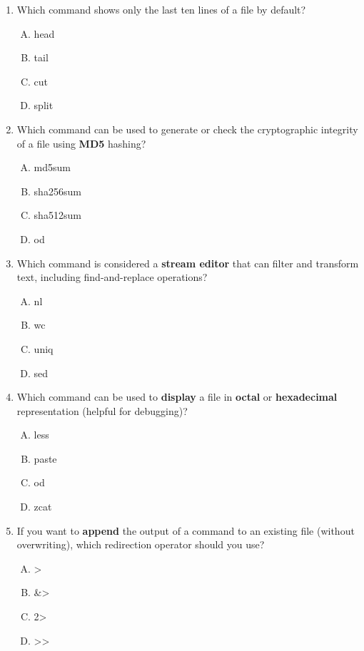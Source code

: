 \documentclass[a4paper]{report}
\begin{document}
\begin{enumerate}[1.]
    \item Which command shows only the last ten lines of a file by default?  
    \begin{enumerate}[A)]
        \item head  
        \item tail  
        \item cut  
        \item split  
    \end{enumerate}

    \item Which command can be used to generate or check the cryptographic integrity of a file using \textbf{MD5} hashing?  
    \begin{enumerate}[A)]
        \item md5sum  
        \item sha256sum  
        \item sha512sum  
        \item od  
    \end{enumerate}

    \item Which command is considered a \textbf{stream editor} that can filter and transform text, including find-and-replace operations?  
    \begin{enumerate}[A)]
        \item nl  
        \item wc  
        \item uniq  
        \item sed  
    \end{enumerate}

    \item Which command can be used to \textbf{display} a file in \textbf{octal} or \textbf{hexadecimal} representation (helpful for debugging)?  
    \begin{enumerate}[A)]
        \item less  
        \item paste  
        \item od  
        \item zcat  
    \end{enumerate}

    \item If you want to \textbf{append} the output of a command to an existing file (without overwriting), which redirection operator should you use?  
    \begin{enumerate}[A)]
        \item >  
        \item \&>  
        \item 2>  
        \item >>  
    \end{enumerate}


\end{enumerate}
\end{document}
